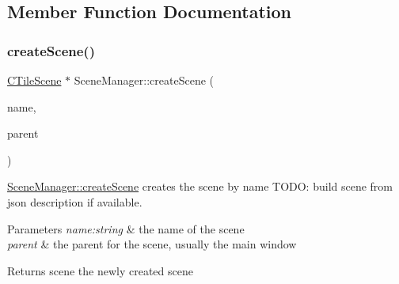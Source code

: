 \subsection{Member Function Documentation}
\mbox{\label{class_scene_manager_a0da379e114fea306e72feab6acc358ca}} 
\subsubsection{\texorpdfstring{create\+Scene()}{createScene()}}
{\footnotesize\ttfamily \hyperlink{class_c_tile_scene}{C\+Tile\+Scene} $\ast$ Scene\+Manager\+::create\+Scene (\begin{DoxyParamCaption}\item[{const Q\+String \&}]{name,  }\item[{C\+Object $\ast$}]{parent }\end{DoxyParamCaption})}



\hyperlink{class_scene_manager_a0da379e114fea306e72feab6acc358ca}{Scene\+Manager\+::create\+Scene} creates the scene by name T\+O\+DO\+: build scene from json description if available. 


\begin{DoxyParams}{Parameters}
{\em name\+:string} & the name of the scene \\
\hline
{\em parent} & the parent for the scene, usually the main window \\
\hline
\end{DoxyParams}
\begin{DoxyReturn}{Returns}
scene the newly created scene 
\end{DoxyReturn}

